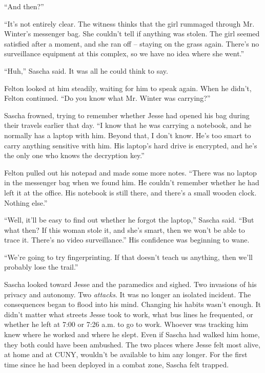 \documentclass[12pt]{book}
\begin{document}
``And then?''

``It's not entirely clear.  The witness thinks that the girl rummaged through Mr. Winter's messenger bag.  She couldn't tell if anything was stolen.  The girl seemed satisfied after a moment, and she ran off -- staying on the grass again.  There's no surveillance equipment at this complex, so we have no idea where she went.''

``Huh,'' Sascha said.  It was all he could think to say.

Felton looked at him steadily, waiting for him to speak again.  When he didn't, Felton continued.  ``Do you know what Mr. Winter was carrying?''

Sascha frowned, trying to remember whether Jesse had opened his bag during their travels earlier that day.  ``I know that he was carrying a notebook, and he normally has a laptop with him.  Beyond that, I don't know.  He's too smart to carry anything sensitive with him.  His laptop's hard drive is encrypted, and he's the only one who knows the decryption key.''

Felton pulled out his notepad and made some more notes.  ``There was no laptop in the messenger bag when we found him.  He couldn't remember whether he had left it at the office.  His notebook is still there, and there's a small wooden clock.  Nothing else.''

``Well, it'll be easy to find out whether he forgot the laptop,'' Sascha said.  ``But what then?  If this woman stole it, and she's smart, then we won't be able to trace it.  There's no video surveillance.''  His confidence was beginning to wane.

``We're going to try fingerprinting.  If that doesn't teach us anything, then we'll probably lose the trail.''

Sascha looked toward Jesse and the paramedics and sighed.  Two invasions of his privacy and autonomy.  Two \emph{attacks}.  It was no longer an isolated incident.  The consequences began to flood into his mind.  Changing his habits wasn't enough.  It didn't matter what streets Jesse took to work, what bus lines he frequented, or whether he left at 7:00 or 7:26 a.m. to go to work.  Whoever was tracking him knew where he worked and where he slept.  Even if Sascha had walked him home, they both could have been ambushed.  The two places where Jesse felt most alive, at home and at CUNY, wouldn't be available to him any longer.  For the first time since he had been deployed in a combat zone, Sascha felt trapped.
\end{document}
